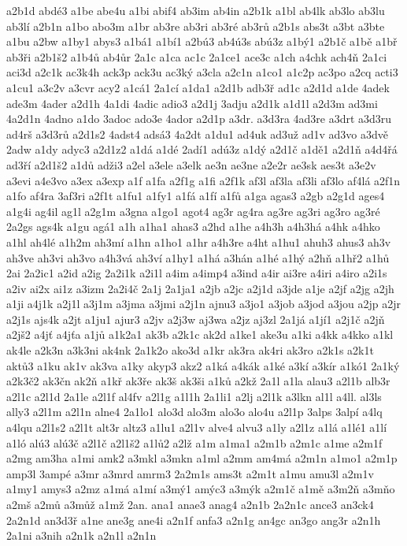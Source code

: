 a2b1d
abdé3
a1be
abe4u
a1bi
abif4
ab3im
ab4in
a2b1k
a1bl
ab4lk
ab3lo
ab3lu
ab3lí
a2b1n
a1bo
abo3m
a1br
ab3re
ab3ri
ab3ré
ab3rů
a2b1s
abs3t
a3bt
a3bte
a1bu
a2bw
a1by1
abys3
a1bá1
a1bí1
a2bú3
ab4ú3s
abú3z
a1bý1
a2b1č
a1bě
a1bř
ab3ři
a2b1š2
a1b4ů
ab4ůr
2a1c
a1ca
ac1c
2a1ce1
ace3c
a1ch
a4chk
ach4ň
2a1ci
aci3d
a2c1k
ac3k4h
ack3p
ack3u
ac3ký
a3cla
a2c1n
a1co1
a1c2p
ac3po
a2cq
acti3
a1cu1
a3c2v
a3cvr
acy2
a1cá1
2a1cí
a1da1
a2d1b
adb3ř
ad1c
a2d1d
a1de
4adek
ade3m
4ader
a2d1h
4a1di
4adic
adio3
a2d1j
3adju
a2d1k
a1d1l
a2d3m
ad3mi
4a2d1n
4adno
a1do
3adoc
ado3e
4ador
a2d1p
a3dr.
a3d3ra
4ad3re
a3drt
a3d3ru
ad4rš
a3d3rů
a2d1s2
4adst4
adsá3
4a2dt
a1du1
ad4uk
ad3už
ad1v
ad3vo
a3dvě
2adw
a1dy
adyc3
a2d1z2
a1dá
a1dé
2adí1
adú3z
a1dý
a2d1č
a1dě1
a2d1ň
a4d4řá
ad3ří
a2d1š2
a1dů
adži3
a2el
a3ele
a3elk
ae3n
ae3ne
a2e2r
ae3sk
aes3t
a3e2v
a3evi
a4e3vo
a3ex
a3exp
a1f
a1fa
a2f1g
a1fi
a2f1k
af3l
af3la
af3li
af3lo
af4lá
a2f1n
a1fo
af4ra
3af3ri
a2f1t
a1fu1
a1fy1
a1fá
a1fí
a1fů
a1ga
agas3
a2gb
a2g1d
ages4
a1g4i
ag4il
ag1l
a2g1m
a3gna
a1go1
agot4
ag3r
ag4ra
ag3re
ag3ri
ag3ro
ag3ré
2a2gs
ags4k
a1gu
agá1
a1h
a1ha1
ahas3
a2hd
a1he
a4h3h
a4h3há
a4hk
a4hko
a1hl
ah4lé
a1h2m
ah3mí
a1hn
a1ho1
a1hr
a4h3re
a4ht
a1hu1
ahuh3
ahus3
ah3v
ah3ve
ah3vi
ah3vo
a4h3vá
ah3ví
a1hy1
a1há
a3hán
a1hé
a1hý
a2hň
a1hř2
a1hů
2ai
2a2ic1
a2id
a2ig
2a2i1k
a2i1l
a4im
a4imp4
a3ind
a4ir
ai3re
a4iri
a4iro
a2i1s
a2iv
ai2x
ai1z
a3izm
2a2i4č
2a1j
2a1ja1
a2jb
a2jc
a2j1d
a3jde
a1je
a2jf
a2jg
a2jh
a1ji
a4j1k
a2j1l
a3j1m
a3jma
a3jmi
a2j1n
ajnu3
a3jo1
a3job
a3jod
a3jou
a2jp
a2jr
a2j1s
ajs4k
a2jt
a1ju1
ajur3
a2jv
a2j3w
aj3wa
a2jz
aj3zl
2a1já
a1jí1
a2j1č
a2jň
a2jš2
a4jť
a4jťa
a1jů
a1k2a1
ak3b
a2k1c
ak2d
a1ke1
ake3u
a1ki
a4kk
a4kko
a1kl
ak4le
a2k3n
a3k3ni
ak4nk
2a1k2o
ako3d
a1kr
ak3ra
ak4ri
ak3ro
a2k1s
a2k1t
aktů3
a1ku
ak1v
ak3va
a1ky
akyp3
akz2
a1ká
a4kák
a1ké
a3kí
a3kír
a1kó1
2a1ký
a2k3č2
ak3čn
ak2ň
a1kř
ak3ře
ak3š
ak3ši
a1ků
a2kž
2a1l
a1la
alau3
a2l1b
alb3r
a2l1c
a2l1d
2a1le
a2l1f
al4fv
a2l1g
a1l1h
2a1li1
a2lj
a2l1k
a3lkn
al1l
a4ll.
al3ls
ally3
a2l1m
a2l1n
alne4
2a1lo1
alo3d
alo3m
alo3o
alo4u
a2l1p
3alps
3alpí
a4lq
a4lqu
a2l1s2
a2l1t
alt3r
altz3
a1lu1
a2l1v
alve4
alvu3
a1ly
a2l1z
a1lá
a1lé1
a1lí
a1ló
alú3
alú3č
a2l1č
a2l1š2
a1lů2
a2lž
a1m
a1ma1
a2m1b
a2m1c
a1me
a2m1f
a2mg
am3ha
a1mi
amk2
a3mkl
a3mkn
a1ml
a2mm
am4má
a2m1n
a1mo1
a2m1p
amp3l
3ampé
a3mr
a3mrd
amrm3
2a2m1s
ams3t
a2m1t
a1mu
amu3l
a2m1v
a1my1
amys3
a2mz
a1má
a1mí
a3mý1
amýc3
a3mýk
a2m1č
a1mě
a3m2ň
a3mňo
a2mš
a2mů
a3můž
a1mž
2an.
ana1
anae3
anag4
a2n1b
2a2n1c
ance3
an3ck4
2a2n1d
an3d3ř
a1ne
ane3g
ane4i
a2n1f
anfa3
a2n1g
an4gc
an3go
ang3r
a2n1h
2a1ni
a3nih
a2n1k
a2n1l
a2n1n
